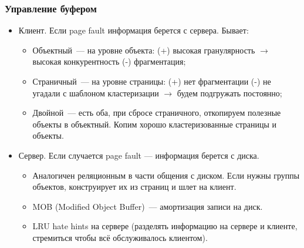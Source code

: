 \documentclass{beamer}
\begin{document}
\begin{frame}
\frametitle{Управление буфером}

\begin{itemize}
  \item Клиент. Если page fault информация берется с сервера. Бывает:
  \begin{itemize}
    \item Объектный~--- на уровне объекта: (+) высокая гранулярность $\longrightarrow$ высокая конкурентность (-) фрагментация;
    \item Страничный~--- на уровне страницы: (+) нет фрагментации (-) не угадали с шаблоном кластеризации $\longrightarrow$ будем подгружать постоянно;
    
    \item Двойной~--- есть оба, при сбросе страничного, откопируем полезные объекты в объектный. Копим хорошо кластеризованные страницы и объекты.
  \end{itemize}
  \item Сервер. Если случается page fault --- информация берется с диска.
  \begin{itemize}
    \item Аналогичен реляционным в части общения с диском. Если нужны группы объектов, конструирует их из страниц и шлет на клиент.
    \item MOB (Modified Object Buffer)~--- амортизация записи на диск.
    \item LRU hate hints на сервере (разделять информацию на сервере и клиенте, стремиться чтобы всё обслуживалось клиентом).
  \end{itemize}
  
\end{itemize}
\end{frame}
\end{document}
